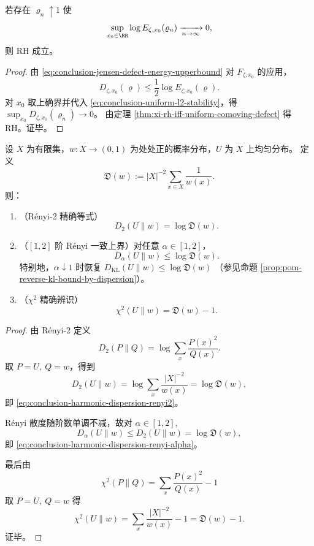 \begin{corollary}[一致 \(L^2\) 稳定推出 RH]\label{cor:conclusion-rh-from-uniform-l2-stability}
若存在 \(\varrho_n\uparrow 1\) 使
\begin{equation}\label{eq:conclusion-uniform-l2-stability}
\sup_{x_0\in\RR}\log E_{\zeta,x_0}(\varrho_n)\xrightarrow[n\to\infty]{}0,
\end{equation}
则 RH 成立。
\end{corollary}
\begin{proof}
由 \eqref{eq:conclusion-jensen-defect-energy-upperbound} 对 \(F_{\zeta,x_0}\) 的应用，
\[
D_{\zeta,x_0}(\varrho)\le \frac12\log E_{\zeta,x_0}(\varrho).
\]
对 \(x_0\) 取上确界并代入 \eqref{eq:conclusion-uniform-l2-stability}，得
\(
\sup_{x_0}D_{\zeta,x_0}(\varrho_n)\to 0
\)。
由定理 \ref{thm:xi-rh-iff-uniform-comoving-defect} 得 RH。证毕。
\end{proof}

\begin{theorem}\label{thm:conclusion-harmonic-dispersion-renyi-chi2}
设 \(X\) 为有限集，\(w:X\to(0,1)\) 为处处正的概率分布，\(U\) 为 \(X\) 上均匀分布。
定义
\[
\mathfrak D(w):=|X|^{-2}\sum_{x\in X}\frac{1}{w(x)}.
\]
则：
\begin{enumerate}
  \item （Rényi-2 精确等式）
  \begin{equation}\label{eq:conclusion-harmonic-dispersion-renyi2}
  \boxed{\;D_2(U\|w)=\log \mathfrak D(w).\;}
  \end{equation}
  \item （\([1,2]\) 阶 Rényi 一致上界）对任意 \(\alpha\in[1,2]\)，
  \begin{equation}\label{eq:conclusion-harmonic-dispersion-renyi-alpha}
  \boxed{\;D_\alpha(U\|w)\le \log \mathfrak D(w).\;}
  \end{equation}
  特别地，\(\alpha\downarrow 1\) 时恢复
  \(
  D_{\mathrm{KL}}(U\|w)\le \log\mathfrak D(w)
  \)
  （参见命题 \ref{prop:pom-reverse-kl-bound-by-dispersion}）。
  \item （\(\chi^2\) 精确辨识）
  \begin{equation}\label{eq:conclusion-harmonic-dispersion-chi2}
  \boxed{\;\chi^2(U\|w)=\mathfrak D(w)-1.\;}
  \end{equation}
\end{enumerate}
\end{theorem}
\begin{proof}
由 Rényi-2 定义
\[
D_2(P\|Q)=\log\sum_x\frac{P(x)^2}{Q(x)}.
\]
取 \(P=U,\ Q=w\)，得到
\[
D_2(U\|w)=\log\sum_x\frac{|X|^{-2}}{w(x)}=\log\mathfrak D(w),
\]
即 \eqref{eq:conclusion-harmonic-dispersion-renyi2}。

Rényi 散度随阶数单调不减，故对 \(\alpha\in[1,2]\),
\[
D_\alpha(U\|w)\le D_2(U\|w)=\log\mathfrak D(w),
\]
即 \eqref{eq:conclusion-harmonic-dispersion-renyi-alpha}。

最后由
\[
\chi^2(P\|Q)=\sum_x\frac{P(x)^2}{Q(x)}-1
\]
取 \(P=U,\ Q=w\) 得
\[
\chi^2(U\|w)=\sum_x\frac{|X|^{-2}}{w(x)}-1=\mathfrak D(w)-1.
\]
证毕。
\end{proof}

